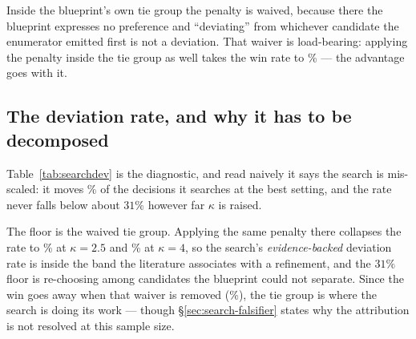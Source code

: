 Inside the blueprint's own tie group the penalty is waived, because there the blueprint expresses no
preference and ``deviating'' from whichever candidate the enumerator emitted first is not a
deviation. That waiver is load-bearing: applying the penalty inside the tie group as well takes the
win rate to \vsixSearchTieGuardedWin\% --- the advantage goes with it.

\subsection{The deviation rate, and why it has to be decomposed}
\label{app:search-kappa}

Table~\ref{tab:searchdev} is the diagnostic, and read naively it says the search is mis-scaled: it
moves \vsixSearchDevTwoFive\% of the decisions it searches at the best setting, and the rate never
falls below about $31\%$ however far $\kappa$ is raised.

The floor is the waived tie group. Applying the same penalty there collapses the rate to
\vsixSearchDevGuardedTwoFive\% at $\kappa = 2.5$ and \vsixSearchDevGuardedFour\% at
$\kappa = 4$, so the search's \emph{evidence-backed} deviation rate is inside the band the
literature associates with a refinement, and the $31\%$ floor is re-choosing among candidates the
blueprint could not separate. Since the win goes away when that waiver is removed
(\vsixSearchTieGuardedWin\%), the tie group is where the search is doing its work --- though
\S\ref{sec:search-falsifier} states why the attribution is not resolved at this sample size.
